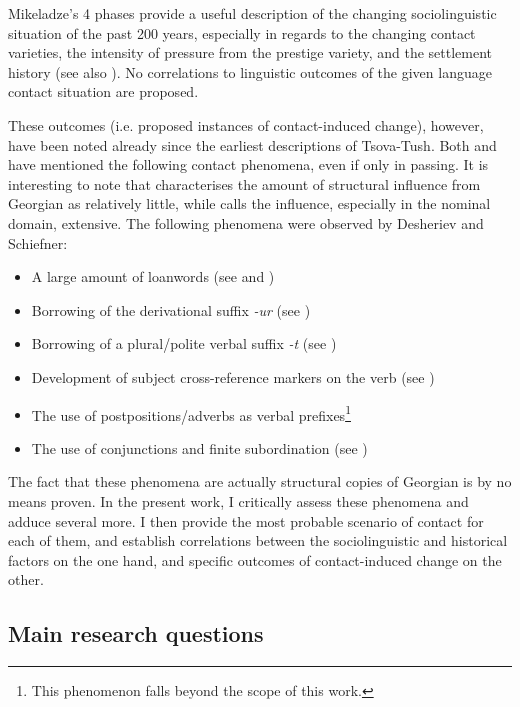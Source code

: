 Mikeladze's 4 phases provide a useful description of the changing sociolinguistic situation of the past 200 years, especially in regards to the changing contact varieties, the intensity of pressure from the prestige variety, and the settlement history (see also \cite{gigashvili2014migration}). No correlations to linguistic outcomes of the given language contact situation are proposed.

These outcomes (i.e. proposed instances of contact-induced change), however, have been noted already since the earliest descriptions of Tsova-Tush. Both \textcite[4]{schiefner56} and \textcite[12--14]{desheriev53} have mentioned the following contact phenomena, even if only in passing. It is interesting to note that \textcite[12--14]{desheriev53} characterises the amount of structural influence from Georgian as relatively little, while \textcite[4]{schiefner56} calls the influence, especially in the nominal domain, extensive. The following phenomena were observed by Desheriev and Schiefner:

\begin{itemize}
	\item A large amount of loanwords (see \textcite{WS,gippert08} and )
	\item Borrowing of the derivational suffix \textit{-ur} (see )
	\item Borrowing of a plural/polite verbal suffix \textit{-t} (see )
	\item Development of subject cross-reference markers on the verb (see )
	\item The use of postpositions/adverbs as verbal prefixes\footnote{This phenomenon falls beyond the scope of this work.}
	\item The use of conjunctions and finite subordination (see )
\end{itemize}

The fact that these phenomena are actually structural copies of Georgian is by no means proven. In the present work, I critically assess these phenomena and adduce several more. I then provide the most probable scenario of contact for each of them, and establish correlations between the sociolinguistic and historical factors on the one hand, and specific outcomes of contact-induced change on the other.

\subsection{Main research questions}	\label{question}


